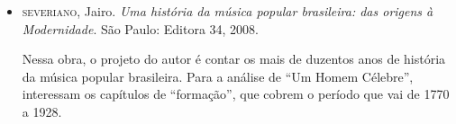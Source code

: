 \documentclass[11pt]{extarticle}
\begin{document}
\begin{itemize}
\item \textsc{severiano}, Jairo. \textit{Uma história da música popular brasileira: das
origens à Modernidade}. São Paulo: Editora 34, 2008.

Nessa obra, o projeto do autor é contar os mais de duzentos anos de
história da música popular brasileira. Para a análise de ``Um Homem
Célebre'', interessam os capítulos de ``formação'', que cobrem o período
que vai de 1770 a 1928.

\end{itemize}
\end{document}
